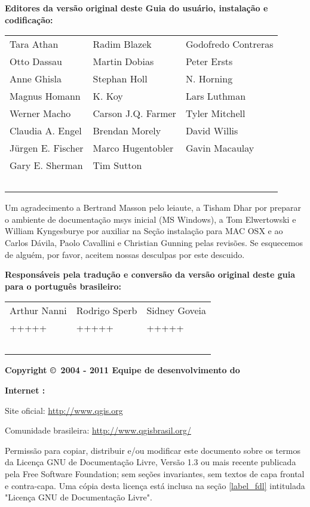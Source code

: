 \begin{flushleft}
\textbf{Editores da versão original deste Guia do usuário, instalação e codificação:}
  \par\bigskip\noindent
\begin{tabular}{p{4cm} p{4cm} p{4cm}}
Tara Athan & Radim Blazek & Godofredo Contreras \\
Otto Dassau & Martin Dobias & Peter Ersts \\
Anne Ghisla & Stephan Holl & N. Horning \\
Magnus Homann & K. Koy & Lars Luthman \\ 
Werner Macho & Carson J.Q. Farmer & Tyler Mitchell \\
Claudia A. Engel & Brendan Morely & David Willis \\
Jürgen E. Fischer & Marco Hugentobler & Gavin Macaulay \\
Gary E. Sherman & Tim Sutton \\ \
\end{tabular}
\end{flushleft}

Um agradecimento a Bertrand Masson pelo leiaute, a Tisham Dhar por preparar o ambiente de documentação msys inicial (MS Windows), a Tom Elwertowski e William Kyngesburye por auxiliar na Seção instalação para MAC OSX e ao Carlos Dávila, Paolo Cavallini e Christian Gunning pelas revisões. Se esquecemos de alguém, por favor, aceitem nossas desculpas por este descuido.
\par\bigskip\noindent

\begin{flushleft}
\textbf{Responsáveis pela tradução e conversão da versão original deste guia para o português brasileiro:}
  \par\bigskip\noindent
\begin{tabular}{p{4cm} p{4cm} p{4cm}}
Arthur Nanni & Rodrigo Sperb & Sidney Goveia \\
+++++ & +++++ & +++++ \\ \
\end{tabular}
\end{flushleft}


\textbf{Copyright \copyright~2004 - 2011 Equipe de desenvolvimento do \QG}
\par\bigskip\noindent
\textbf{Internet :}
\par\bigskip
Site oficial: \url{http://www.qgis.org}
\par\bigskip
Comunidade brasileira: \url{http://www.qgisbrasil.org/}


Permissão para copiar, distribuir e/ou modificar este documento sobre os termos da Licença GNU de Documentação Livre, Versão 1.3 ou mais recente publicada pela Free Software Foundation; sem seções invariantes, sem textos de capa frontal e contra-capa. Uma cópia desta licença está inclusa na seção \ref{label_fdl} intitulada "Licença GNU de Documentação Livre".

\newpage
